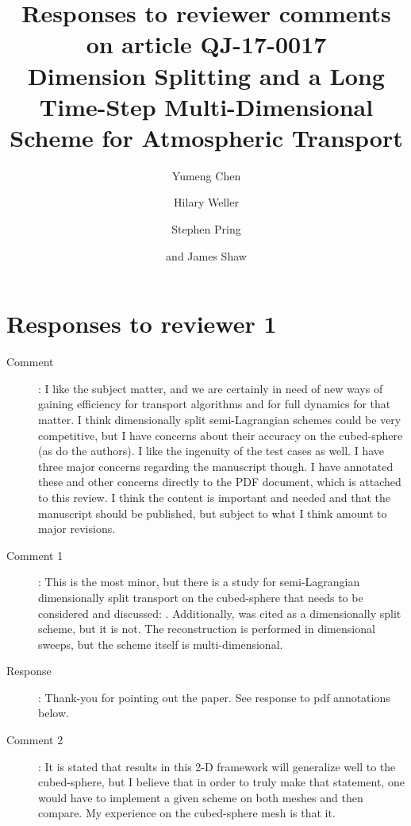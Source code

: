 \documentclass[12pt]{article}
\begin{document}
\title{Responses to reviewer comments on article QJ-17-0017\\
Dimension Splitting and a Long Time-Step Multi-Dimensional Scheme for Atmospheric Transport}
\author{Yumeng Chen \and Hilary Weller \and Stephen Pring \and and James Shaw}
\maketitle

\section*{Responses to reviewer 1}

\begin{description}

\item [Comment]:
I like the subject matter, and we are certainly in need of new ways of gaining efficiency for transport algorithms and for full dynamics for that matter. I think dimensionally split semi-Lagrangian schemes could be very competitive, but I have concerns about their accuracy on the cubed-sphere (as do the authors). I like the ingenuity of the test cases as well. I have three major concerns regarding the manuscript though. I have annotated these and other concerns directly to the PDF document, which is attached to this review. I think the content is important and needed and that the manuscript should be published, but subject to what I think amount to major revisions.

\item [Comment 1]: This is the most minor, but there is a study for semi-Lagrangian dimensionally split transport on the cubed-sphere that needs to be considered and discussed: \cite{GNQ14}. Additionally, \cite{KNK15} was cited as a dimensionally split scheme, but it is not. The reconstruction is performed in dimensional sweeps, but the scheme itself is multi-dimensional.

\item [Response]: 
Thank-you for pointing out the \cite{GNQ14} paper. See response to pdf annotations below.

\item [Comment 2]:
It is stated that results in this 2-D framework will generalize well to the cubed-sphere, but I believe that in order to truly make that statement, one would have to implement a given scheme on both meshes and then compare. My experience on the cubed-sphere mesh is that it.


\end{description}
\end{document}
